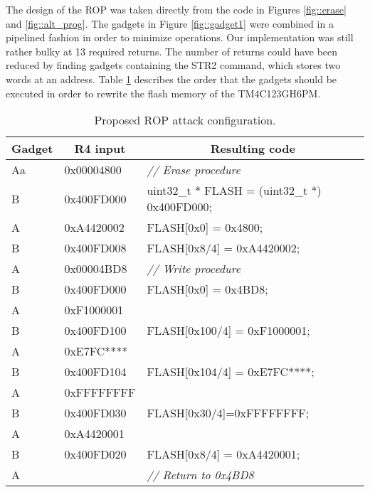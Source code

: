 The design of the ROP was taken directly from the code in Figures \ref{fig::erase} and \ref{fig::alt_prog}. The gadgets in Figure \ref{fig::gadget1} were combined in a pipelined fashion in order to minimize operations. Our implementation was still rather bulky at 13 required returns. The number of returns could have been reduced by finding gadgets containing the STR2 command, which stores two words at an address. Table \ref{tab:gadgets} describes the order that the gadgets should be executed in order to rewrite the flash memory of the TM4C123GH6PM.

\begin{table}[htbp]
  \centering
  \caption{Proposed ROP attack configuration. }
    \begin{tabular}{rrr}
    \toprule
    \multicolumn{1}{c}{Gadget} & \multicolumn{1}{c}{R4 input} & \multicolumn{1}{c}{Resulting code} \\
    \midrule
    \multicolumn{1}{l}{Aa} & \multicolumn{1}{l}{0x00004800} & \multicolumn{1}{l}{\textit{// Erase procedure}} \\
    \multicolumn{1}{l}{B} & \multicolumn{1}{l}{0x400FD000} & \multicolumn{1}{l}{uint32\_t * FLASH = (uint32\_t *) 0x400FD000;} \\
    \multicolumn{1}{l}{A} & \multicolumn{1}{l}{0xA4420002} & \multicolumn{1}{l}{FLASH[0x0] = 0x4800;} \\
    \multicolumn{1}{l}{B} & \multicolumn{1}{l}{0x400FD008} & \multicolumn{1}{l}{FLASH[0x8/4] = 0xA4420002;} \\
    \multicolumn{1}{l}{A} & \multicolumn{1}{l}{0x00004BD8} & \multicolumn{1}{l}{\textit{// Write procedure}} \\
    \multicolumn{1}{l}{B} & \multicolumn{1}{l}{0x400FD000} & \multicolumn{1}{l}{FLASH[0x0] = 0x4BD8;} \\
    \multicolumn{1}{l}{A} & \multicolumn{1}{l}{0xF1000001} &  \\
    \multicolumn{1}{l}{B} & \multicolumn{1}{l}{0x400FD100} & \multicolumn{1}{l}{FLASH[0x100/4] = 0xF1000001;} \\
    \multicolumn{1}{l}{A} & \multicolumn{1}{l}{0xE7FC****} &  \\
    \multicolumn{1}{l}{B} & \multicolumn{1}{l}{0x400FD104} & \multicolumn{1}{l}{FLASH[0x104/4] = 0xE7FC****;} \\
    \multicolumn{1}{l}{A} & \multicolumn{1}{l}{0xFFFFFFFF} & \multicolumn{1}{l}{} \\
    \multicolumn{1}{l}{B} & \multicolumn{1}{l}{0x400FD030} & \multicolumn{1}{l}{FLASH[0x30/4]=0xFFFFFFFF;} \\
    \multicolumn{1}{l}{A} & \multicolumn{1}{l}{0xA4420001} &  \\
    \multicolumn{1}{l}{B} & \multicolumn{1}{l}{0x400FD020} & \multicolumn{1}{l}{FLASH[0x8/4] = 0xA4420001;} \\
    \multicolumn{1}{l}{A} &            & \multicolumn{1}{l}{\textit{// Return to 0x4BD8}} \\
    \bottomrule
    \end{tabular}%
  \label{tab:gadgets}%
\end{table}%
